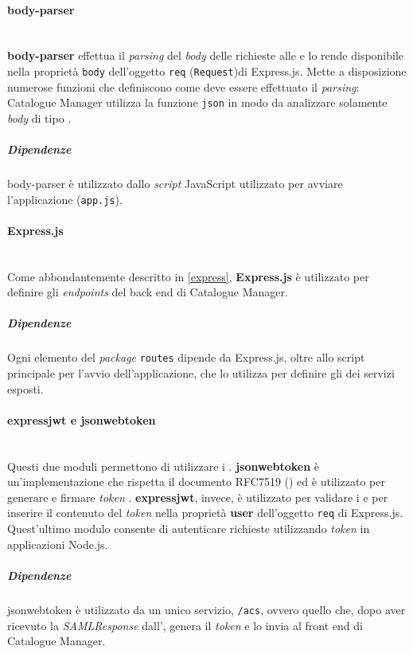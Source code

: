 \paragraph{body-parser} \mbox{} \\
\textbf{body-parser} effettua il \textit{parsing} del \textit{body} delle richieste alle  e lo rende disponibile nella proprietà \texttt{body} dell'oggetto \texttt{req} (\texttt{Request})di Express.js. Mette a disposizione numerose funzioni che definiscono come deve essere effettuato il \textit{parsing}: Catalogue Manager utilizza la funzione \texttt{json} in modo da analizzare solamente \textit{body} di tipo .
\subparagraph{Dipendenze}
body-parser è utilizzato dallo \textit{script} JavaScript utilizzato per avviare l'applicazione (\texttt{app.js}).

\paragraph{Express.js} \mbox{} \\
Come abbondantemente descritto in \ref{express}, \textbf{Express.js} è utilizzato per definire gli \textit{endpoints} del back end di Catalogue Manager. 

\subparagraph{Dipendenze}
Ogni elemento del \textit{package} \texttt{routes} dipende da Express.js, oltre allo script principale per l'avvio dell'applicazione, che lo utilizza per definire gli  dei servizi esposti.

\paragraph{expressjwt e jsonwebtoken} \mbox{} \\
Questi due moduli permettono di utilizzare i . \textbf{jsonwebtoken} è un'implementazione che rispetta il documento RFC7519 (\cite{rfc:7519}) ed è utilizzato per generare e firmare \textit{token} . \textbf{expressjwt}, invece, è utilizzato per validare i  e per inserire il contenuto del \textit{token} nella proprietà \textbf{user} dell'oggetto \texttt{req} di Express.js. Quest'ultimo modulo consente di autenticare richieste  utilizzando \textit{token}  in applicazioni Node.js. 

\subparagraph{Dipendenze}
jsonwebtoken è utilizzato da un unico servizio, \texttt{/acs}, ovvero quello che, dopo aver ricevuto la \textit{SAMLResponse} dall', genera il \textit{token} e lo invia al front end di Catalogue Manager.


